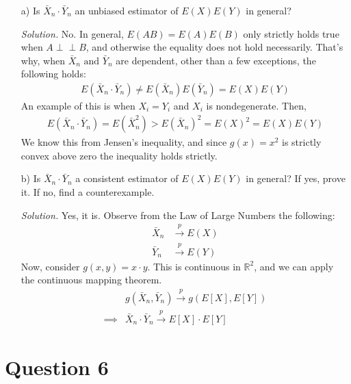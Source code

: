 \documentclass[
]{article}
\begin{document}
\begin{enumerate}

\item[a)] Is $\bar{X}_n \cdot \bar{Y}_n$ an unbiased estimator of $E(X)E(Y)$ in general?  
  
\textit{Solution.} No. In general, $E(AB) = E(A) E(B)$ only strictly holds true when $A \perp \!\!\! \perp B$, and otherwise the equality does not hold necessarily. That's why, when $ \bar{X}_n \text{ and } \bar{Y}_n$ are dependent, other than a few exceptions, the following holds:
$$\begin{aligned}
E(\bar{X}_n \cdot \bar{Y}_n) \neq E(\bar{X}_n)E(\bar{Y}_n) = E(X)E(Y)
\end{aligned}$$
An example of this is when $X_i = Y_i$ and $X_i$ is nondegenerate. Then, 
\[\begin{aligned}
E(\bar{X}_n \cdot \bar{Y}_n) = E(\bar{X}_n^2) > E(\bar{X}_n)^2 = E(X)^2 = E(X)E(Y)
\end{aligned}\]
We know this from Jensen's inequality, and since $g(x) = x^2$ is strictly convex above zero the inequality holds strictly.  
  
\item[b)] Is $\bar{X}_n \cdot \bar{Y}_n$ a consistent estimator of $E(X)E(Y)$ in general? If yes, prove it. If no, find a counterexample.  
  
\textit{Solution.} Yes, it is. 
Observe from the Law of Large Numbers the following: 
\[\begin{aligned}
\bar{X}_n &\stackrel{p}{\to} E(X) \\
\bar{Y}_n &\stackrel{p}{\to} E(Y)
\end{aligned}\] 
Now, consider $g(x, y) = x \cdot y$. This is continuous in $\mathbb{R}^2$, and we can apply the continuous mapping theorem. 
\[\begin{aligned} 
&g(\bar{X}_n, \bar{Y}_n) \stackrel{p}{\to} g(E[X], E[Y]) \\
\implies& \bar{X}_n \cdot \bar{Y}_n \stackrel{p}{\to} E[X] \cdot E[Y]
\end{aligned}\]
  
\end{enumerate}

\hypertarget{question-6}{%
\section{Question 6}\label{question-6}}
\end{document}
